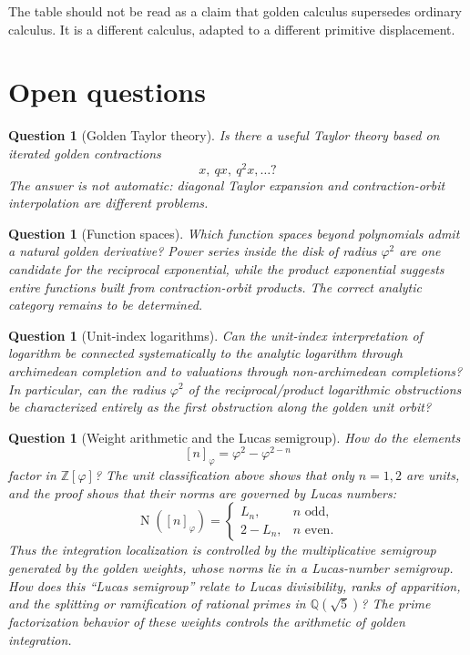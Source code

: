 \documentclass[11pt]{article}
\newtheorem{question}[definition]{Question}
\newcommand{\Nm}{\operatorname{N}}
\newcommand{\ph}{\varphi}
\newcommand{\Z}{\mathbb{Z}}
\newcommand{\Q}{\mathbb{Q}}
\begin{document}
The table should not be read as a claim that golden calculus supersedes ordinary calculus.  It is a different calculus, adapted to a different primitive displacement.

\section{Open questions}

\begin{question}[Golden Taylor theory]
Is there a useful Taylor theory based on iterated golden contractions
\[
    x,
    \ qx,
    \ q^2x,
    \ldots?
\]
The answer is not automatic: diagonal Taylor expansion and contraction-orbit interpolation are different problems.
\end{question}

\begin{question}[Function spaces]
Which function spaces beyond polynomials admit a natural golden derivative?  Power series inside the disk of radius $\ph^2$ are one candidate for the reciprocal exponential, while the product exponential suggests entire functions built from contraction-orbit products.  The correct analytic category remains to be determined.
\end{question}

\begin{question}[Unit-index logarithms]
Can the unit-index interpretation of logarithm be connected systematically to the analytic logarithm through archimedean completion and to valuations through non-archimedean completions?  In particular, can the radius $\ph^2$ of the reciprocal/product logarithmic obstructions be characterized entirely as the first obstruction along the golden unit orbit?
\end{question}

\begin{question}[Weight arithmetic and the Lucas semigroup]
How do the elements
\[
    [n]_{\ph}=\ph^2-\ph^{2-n}
\]
factor in $\Z[\ph]$?  The unit classification above shows that only $n=1,2$ are units, and the proof shows that their norms are governed by Lucas numbers:
\[
    \Nm([n]_{\ph})=
    \begin{cases}
        L_n, & n\text{ odd},\\
        2-L_n, & n\text{ even}.
    \end{cases}
\]
Thus the integration localization is controlled by the multiplicative semigroup generated by the golden weights, whose norms lie in a Lucas-number semigroup.  How does this ``Lucas semigroup'' relate to Lucas divisibility, ranks of apparition, and the splitting or ramification of rational primes in $\Q(\sqrt5)$?  The prime factorization behavior of these weights controls the arithmetic of golden integration.
\end{question}
\end{document}
